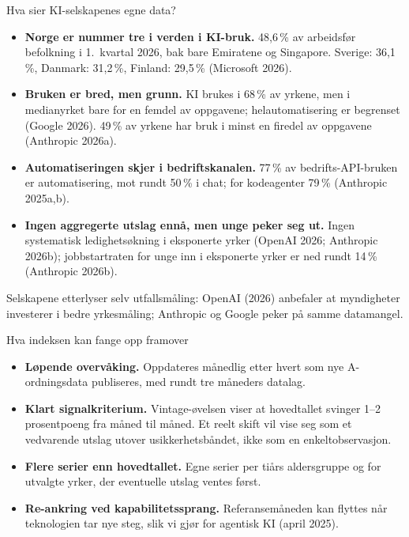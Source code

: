
\begin{frame}{Hva sier KI-selskapenes egne data?}
\small
\begin{itemize}\setlength{\itemsep}{4pt}
  \item \textbf{Norge er nummer tre i verden i KI-bruk.} 48,6\,\% av arbeidsfør befolkning i 1.\ kvartal 2026, bak bare Emiratene og Singapore. Sverige: 36,1\,\%, Danmark: 31,2\,\%, Finland: 29,5\,\% (Microsoft 2026).
  \item \textbf{Bruken er bred, men grunn.} KI brukes i 68\,\% av yrkene, men i medianyrket bare for en femdel av oppgavene; helautomatisering er begrenset (Google 2026). 49\,\% av yrkene har bruk i minst en firedel av oppgavene (Anthropic 2026a).
  \item \textbf{Automatiseringen skjer i bedriftskanalen.} 77\,\% av bedrifts-API-bruken er automatisering, mot rundt 50\,\% i chat; for kodeagenter 79\,\% (Anthropic 2025a,b).
  \item \textbf{Ingen aggregerte utslag ennå, men unge peker seg ut.} Ingen systematisk ledighetsøkning i eksponerte yrker (OpenAI 2026; Anthropic 2026b); jobbstartraten for unge inn i eksponerte yrker er ned rundt 14\,\% (Anthropic 2026b).
\end{itemize}

\vspace{0.3em}
\footnotesize
Selskapene etterlyser selv utfallsmåling: OpenAI (2026) anbefaler at myndigheter investerer i bedre yrkesmåling; Anthropic og Google peker på samme datamangel.
\end{frame}

\begin{frame}{Hva indeksen kan fange opp framover}
\begin{itemize}\setlength{\itemsep}{8pt}
  \item \textbf{Løpende overvåking.} Oppdateres månedlig etter hvert som nye A-ordningsdata publiseres, med rundt tre måneders datalag.
  \item \textbf{Klart signalkriterium.} Vintage-øvelsen viser at hovedtallet svinger 1--2 prosentpoeng fra måned til måned. Et reelt skift vil vise seg som et vedvarende utslag utover usikkerhetsbåndet, ikke som en enkeltobservasjon.
  \item \textbf{Flere serier enn hovedtallet.} Egne serier per tiårs aldersgruppe og for utvalgte yrker, der eventuelle utslag ventes først.
  \item \textbf{Re-ankring ved kapabilitetssprang.} Referansemåneden kan flyttes når teknologien tar nye steg, slik vi gjør for agentisk KI (april 2025).
\end{itemize}
\end{frame}

